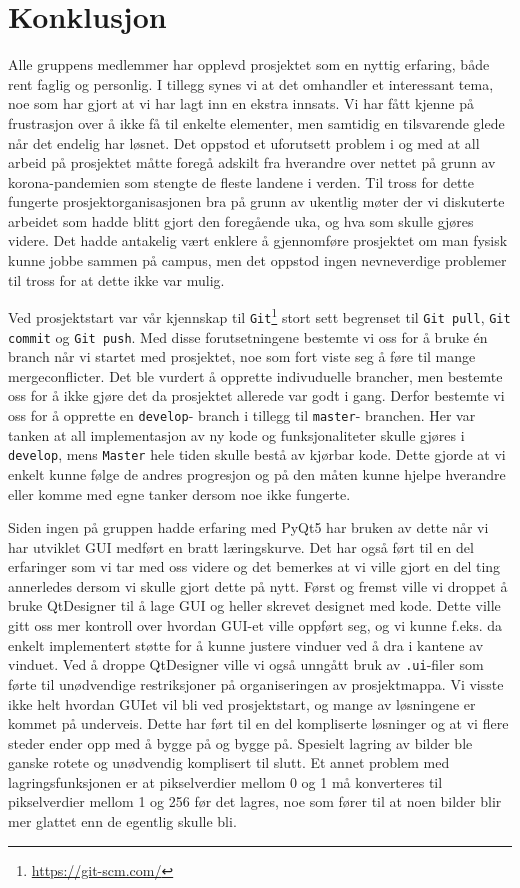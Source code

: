 \newpage
\section{Konklusjon}
Alle gruppens medlemmer har opplevd prosjektet som en nyttig erfaring, både rent faglig og personlig. I tillegg synes vi at det omhandler et interessant tema, noe som har gjort at vi har lagt inn en ekstra innsats. Vi har fått kjenne på frustrasjon over å ikke få til enkelte elementer, men samtidig en tilsvarende glede når det endelig har løsnet. Det oppstod et uforutsett problem i og med at all arbeid på prosjektet måtte foregå adskilt fra hverandre over nettet på grunn av korona-pandemien som stengte de fleste landene i verden. Til tross for dette fungerte prosjektorganisasjonen bra på grunn av ukentlig møter der vi diskuterte arbeidet som hadde blitt gjort den foregående uka, og hva som skulle gjøres videre. Det hadde antakelig vært enklere å gjennomføre prosjektet om man fysisk kunne jobbe sammen på campus, men det oppstod ingen nevneverdige problemer til tross for at dette ikke var mulig.

Ved prosjektstart var vår kjennskap til \texttt{Git}\footnote{\url{https://git-scm.com/}} stort sett begrenset til \texttt{Git pull}, \texttt{Git commit} og \texttt{Git push}. Med disse forutsetningene bestemte vi oss for å bruke én branch når vi startet med prosjektet, noe som fort viste seg å føre til mange mergeconflicter. Det ble vurdert å opprette indivuduelle brancher, men bestemte oss for å ikke gjøre det da prosjektet allerede var godt i gang. Derfor bestemte vi oss for å opprette en \texttt{develop}- branch i tillegg til \texttt{master}- branchen. Her var tanken at all implementasjon av ny kode og funksjonaliteter skulle gjøres i \texttt{develop}, mens \texttt{Master} hele tiden skulle bestå av kjørbar kode. Dette gjorde at vi enkelt kunne følge de andres progresjon og på den måten kunne hjelpe hverandre eller komme med egne tanker dersom noe ikke fungerte.

Siden ingen på gruppen hadde erfaring med PyQt5 har bruken av dette når vi har utviklet GUI medført en bratt læringskurve. Det har også ført til en del erfaringer som vi tar med oss videre og det bemerkes at vi ville gjort en del ting annerledes dersom vi skulle gjort dette på nytt. Først og fremst ville vi droppet å bruke QtDesigner til å lage GUI og heller skrevet designet med kode. Dette ville gitt oss mer kontroll over hvordan GUI-et ville oppført seg, og vi kunne f.eks. da enkelt implementert støtte for å kunne justere vinduer ved å dra i kantene av vinduet. Ved å droppe QtDesigner ville vi også unngått bruk av \texttt{.ui}-filer som førte til unødvendige restriksjoner på organiseringen av prosjektmappa. Vi visste ikke helt hvordan GUIet vil bli ved prosjektstart, og mange av løsningene er kommet på underveis. Dette har ført til en del kompliserte løsninger og at vi flere steder ender opp med å bygge på og bygge på. Spesielt lagring av bilder ble ganske rotete og unødvendig komplisert til slutt. Et annet problem med lagringsfunksjonen er at pikselverdier mellom 0 og 1 må konverteres til pikselverdier mellom 1 og 256 før det lagres, noe som fører til at noen bilder blir mer glattet enn de egentlig skulle bli.

